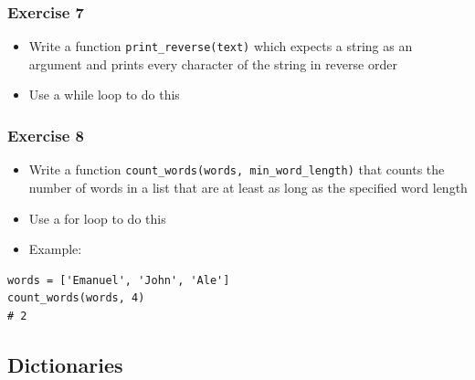 \documentclass[10pt, a4paper]{beamer} %
\begin{document}
{
\bfseries
\begin{frame}[c, fragile]\frametitle{Exercise 7}
    
\begin{itemize}
    \item Write a function \texttt{print\_reverse(text)} which expects a string as an argument and prints every character of the string in reverse order
    \item Use a while loop to do this
\end{itemize}
\end{frame}

\begin{frame}[c, fragile]\frametitle{Exercise 8}
\begin{itemize}
\item Write a function \texttt{count\_words(words, min\_word\_length)} that counts the number of words in a list that are at least as long as the specified word length
\item Use a for loop to do this
\item Example:
\end{itemize}

{
\mdseries
{}
\begin{lstlisting}
words = ['Emanuel', 'John', 'Ale']
count_words(words, 4)
# 2
\end{lstlisting}
}

\end{frame}

}


\subsection{Dictionaries} %
\label{sub:dictionaries}
\end{document}
